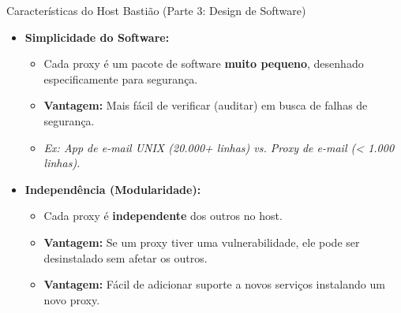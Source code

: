 \begin{frame}{Características do Host Bastião (Parte 3: Design de Software)}
    \begin{itemize}
        \item \textbf{Simplicidade do Software:}
              \begin{itemize}
                  \item Cada proxy é um pacote de software \textbf{muito pequeno}, desenhado especificamente para segurança.
                  \item \textbf{Vantagem:} Mais fácil de verificar (auditar) em busca de falhas de segurança.
                  \item \textit{Ex: App de e-mail UNIX (20.000+ linhas) vs. Proxy de e-mail (< 1.000 linhas).}
              \end{itemize}

        \item \textbf{Independência (Modularidade):}
              \begin{itemize}
                  \item Cada proxy é \textbf{independente} dos outros no host.
                  \item \textbf{Vantagem:} Se um proxy tiver uma vulnerabilidade, ele pode ser desinstalado sem afetar os outros.
                  \item \textbf{Vantagem:} Fácil de adicionar suporte a novos serviços instalando um novo proxy.
              \end{itemize}
    \end{itemize}
\end{frame}

